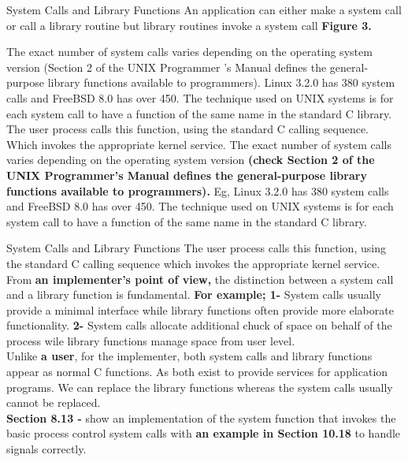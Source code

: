 \documentclass[newPxFont,sthlmFooter,nooffset]{beamer}
\begin{document}
\begin{frame}[t]{System Calls and Library Functions}
An application can either make a system call or call a library routine but library routines invoke a system call \textbf{Figure 3.}

The exact number of system  calls varies depending on the operating system version (Section 2 of the UNIX Programmer ’s Manual defines the general-purpose library functions available to programmers). Linux 3.2.0 has 380 system calls and FreeBSD 8.0 has over 450. The technique used on UNIX systems is for each system call to have a function of the same name in the standard C library. The user process calls this function, using the standard C calling sequence.  Which invokes the appropriate kernel service. The exact number of system  calls varies depending on the operating system version \textbf{(check Section 2 of the UNIX Programmer’s Manual defines the general-purpose library functions available to programmers).} Eg, Linux 3.2.0 has 380 system calls and FreeBSD 8.0 has over 450. The technique used on UNIX systems is for each system call to have a function of the same name in the standard C library.

\end{frame}

\begin{frame}[t]{System Calls and Library Functions}
The user process calls this function, using the standard C calling sequence  which invokes the appropriate kernel service.
From \textbf{an implementer's point of view,} the distinction between a system call and a library function is fundamental. \textbf{For example; 1-} System calls usually provide a minimal interface while library functions often provide more elaborate functionality. \textbf{2-} System calls allocate additional chuck of space on behalf of the process wile library functions manage space from user level.
\\[4pt] Unlike \textbf{a user}, for the implementer, both system calls and library functions appear as normal C functions.  As both exist to provide services for application programs. We can replace the library functions whereas the system calls usually cannot be replaced.\\[4pt]
\textbf{Section 8.13 -} show an implementation of the system function that invokes the basic process control system calls with \textbf{an example in Section 10.18} to handle signals correctly.

\end{frame}
\end{document}
